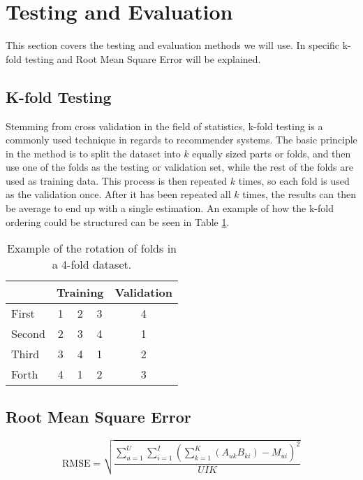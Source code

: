 \section{Testing and Evaluation}
This section covers the testing and evaluation methods we will use. In specific k-fold testing and Root Mean Square Error will be explained.

\subsection{K-fold Testing}
Stemming from cross validation in the field of statistics, k-fold testing is a commonly used technique in regards to recommender systems. The basic principle in the method is to split the dataset into $k$ equally sized parts or folds, and then use one of the folds as the testing or validation set, while the rest of the folds are used as training data. This process is then repeated $k$ times, so each fold is used as the validation once. After it has been repeated all $k$ times, the results can then be average to end up with a single estimation. An example of how the k-fold ordering could be structured can be seen in Table \ref{tbl:bg_k-fold}.

\begin{table}[H]
	\centering
	\begin{tabular}{|l|c|c|c|c|}
		\hline
		& \multicolumn{3}{l|}{Training} & \multicolumn{1}{l|}{Validation} \\ \hline
		First  & 1        & 2        & 3       & 4                               \\ \hline
		Second & 2        & 3        & 4       & 1                               \\ \hline
		Third  & 3        & 4        & 1       & 2                               \\ \hline
		Forth  & 4        & 1        & 2       & 3                               \\ \hline
	\end{tabular}
	\caption{Example of the rotation of folds in a 4-fold dataset.}
	\label{tbl:bg_k-fold}
\end{table}

\subsection{Root Mean Square Error}
\begin{equation}\label{eq:rmse}
	\text{RMSE} = \sqrt{\frac{\sum_{u=1}^{U}\sum_{i=1}^{I}(\sum_{k=1}^{K}(A_{uk} B_{ki}) - M_{ui})^2}{UIK}}
\end{equation}